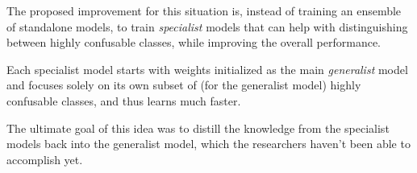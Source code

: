 \documentclass[a4paper,twocolumn]{article}
\begin{document}
The proposed improvement for this situation is, instead of training an ensemble of standalone models, to train \textit{specialist} models that can help with distinguishing between highly confusable classes, while improving the overall performance.

Each specialist model starts with weights initialized as the main \textit{generalist} model and focuses solely on its own subset of (for the generalist model) highly confusable classes, and thus learns much faster.

The ultimate goal of this idea was to distill the knowledge from the specialist models back into the generalist model, which the researchers haven't been able to accomplish yet.
\end{document}
